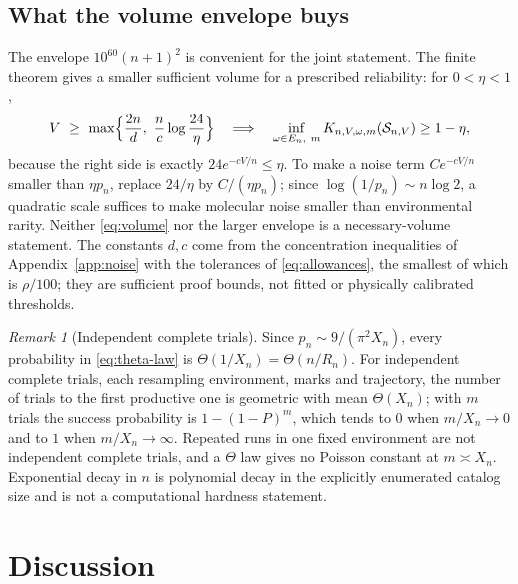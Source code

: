 \documentclass[11pt,letterpaper]{article}
\theoremstyle{plain}
\theoremstyle{definition}
\theoremstyle{remark}
\newtheorem{remark}[theorem]{Remark}
\numberwithin{equation}{section}
\newcommand{\cS}{\mathcal S}
\begin{document}
\subsection{What the volume envelope buys}\label{sec:volume}
The envelope $10^{60}(n+1)^2$ is convenient for the joint statement. The finite theorem gives a smaller sufficient volume for a prescribed reliability: for $0<\eta<1$,
\begin{equation}\label{eq:volume}
 V\ \ge\ \max\Bigl\{\frac{2n}d,\ \frac nc\log\frac{24}\eta\Bigr\}\quad\Longrightarrow\quad
 \inf_{\omega\in E_n,\ m}K_{n,V,\omega,m}(\cS_{n,V})\ge1-\eta ,
\end{equation}
because the right side is exactly $24e^{-cV/n}\le\eta$. To make a noise term $Ce^{-cV/n}$ smaller than $\eta p_n$, replace $24/\eta$ by $C/(\eta p_n)$; since $\log(1/p_n)\sim n\log2$, a quadratic scale suffices to make molecular noise smaller than environmental rarity. Neither \eqref{eq:volume} nor the larger envelope is a necessary-volume statement. The constants $d,c$ come from the concentration inequalities of Appendix~\ref{app:noise} with the tolerances of \eqref{eq:allowances}, the smallest of which is $\rho/100$; they are sufficient proof bounds, not fitted or physically calibrated thresholds.

\begin{remark}[Independent complete trials]
Since $p_n\sim9/(\pi^2X_n)$, every probability in \eqref{eq:theta-law} is $\Theta(1/X_n)=\Theta(n/R_n)$. For independent complete trials, each resampling environment, marks and trajectory, the number of trials to the first productive one is geometric with mean $\Theta(X_n)$; with $m$ trials the success probability is $1-(1-P)^m$, which tends to $0$ when $m/X_n\to0$ and to $1$ when $m/X_n\to\infty$. Repeated runs in one fixed environment are not independent complete trials, and a $\Theta$ law gives no Poisson constant at $m\asymp X_n$. Exponential decay in $n$ is polynomial decay in the explicitly enumerated catalog size and is not a computational hardness statement.
\end{remark}

\section{Discussion}\label{sec:discussion}
\end{document}
